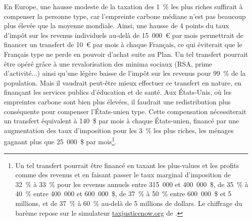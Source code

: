 \documentclass[a5paper,french,openany]{memoir}
\begin{document}
En Europe, une hausse modeste de la taxation des 1~\% les plus riches suffirait à compenser la personne type, car l'empreinte carbone médiane n'est pas beaucoup plus élevée que la moyenne mondiale. Ainsi, une hausse de 4 points du taux d'impôt sur les revenus individuels au-delà de 15~000~\euro{} par mois permettrait de financer un transfert de 10~\euro{} par mois à chaque Français, ce qui éviterait que le Français type ne perde en pouvoir d'achat suite au Plan. Un tel transfert pourrait être opéré grâce à une revalorisation des minima sociaux (RSA, prime d'activité...) ainsi qu'une légère baisse de l'impôt sur les revenus pour 99~\% de la population. Mais il vaudrait peut-être mieux effectuer ce transfert en nature, en finançant les services publics d'éducation et de santé. Aux États-Unis, où les empreintes carbone sont bien plus élevées, il faudrait une redistribution plus conséquente pour compenser l'États-unien type. Cette compensation nécessiterait un transfert équivalent à 140~\$ par mois à chaque États-unien, financé par une augmentation des taux d'imposition pour les 3~\% les plus riches, les ménages gagnant plus que 25~000~\$ par mois\footnote{Un tel transfert pourrait être financé en taxant les plus-values et les profits comme des revenus et en faisant passer le taux marginal d'imposition de 32~\% à 33~\% pour les revenus annuels entre 315~000 et 400~000~\$, de 35~\% à 40~\% entre 400~000 et 600~000~\$, de 37~\% à 50~\% entre 600~000~\$ et 5 millions, et de 37~\% à 60~\% au-delà de 5 millions de dollars. Le chiffrage du barème repose sur le simulateur \href{https://taxjusticenow.org/}{taxjusticenow.org} de \cite{saez_triumph_2019}.}.%

\end{document}
